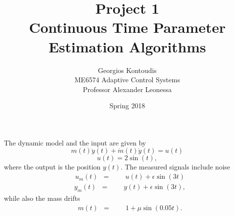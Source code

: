 \documentclass[12pt]{article}
\newenvironment{question}[2][Question]{\begin{trivlist}
\item[\hskip \labelsep {\bfseries #1}\hskip \labelsep {\bfseries #2.}]}{\end{trivlist}}
\begin{document}
 
 
\title{Project 1\\
Continuous Time Parameter Estimation Algorithms}
\author{Georgios Kontoudis\\ 
ME6574 Adaptive Control Systems\\
Professor Alexander Leonessa} 
\date{Spring 2018}
 
\maketitle

\begin{question}{1} %
\end{question}
The dynamic model and the input are given by
\begin{equation}
m(t)\ddot{y}(t)+\dot{m}(t)\dot{y}(t)=u (t)
\end{equation}
\begin{equation}
u(t)=2\sin(t),
\end{equation}
where the output is the position $y(t)$. The measured signals include noise
\begin{equation}\label{eq_u_noise}
\begin{aligned}
& u_m(t)
& =
&&& u(t)+\epsilon \sin(3t)
\end{aligned}
\end{equation}
\begin{equation}\label{eq_y_noise}
\begin{aligned}
& y_m(t) 
& =
&&& y(t) + \epsilon \sin(3t),
\end{aligned}
\end{equation}
while also the mass drifts
\begin{equation}\label{eq_m_drift}
\begin{aligned}
& m(t) 
& =
&&& 1 + \mu \sin(0.05t).
\end{aligned}
\end{equation}
\end{document}
